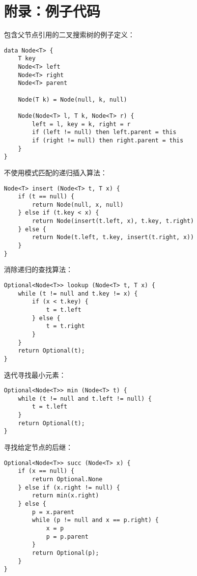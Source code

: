 \documentclass[b5paper]{ctexart}
\begin{document}
\section{附录：例子代码}

包含父节点引用的二叉搜索树的例子定义：

\lstset{language=Bourbaki, frame=single}
\begin{lstlisting}
data Node<T> {
    T key
    Node<T> left
    Node<T> right
    Node<T> parent

    Node(T k) = Node(null, k, null)

    Node(Node<T> l, T k, Node<T> r) {
        left = l, key = k, right = r
        if (left != null) then left.parent = this
        if (right != null) then right.parent = this
    }
}
\end{lstlisting}

不使用模式匹配的递归插入算法：

\begin{lstlisting}
Node<T> insert (Node<T> t, T x) {
    if (t == null) {
        return Node(null, x, null)
    } else if (t.key < x) {
        return Node(insert(t.left, x), t.key, t.right)
    } else {
        return Node(t.left, t.key, insert(t.right, x))
    }
}
\end{lstlisting}

消除递归的查找算法：

\begin{lstlisting}
Optional<Node<T>> lookup (Node<T> t, T x) {
    while (t != null and t.key != x) {
        if (x < t.key) {
            t = t.left
        } else {
            t = t.right
        }
    }
    return Optional(t);
}
\end{lstlisting}

迭代寻找最小元素：

\begin{lstlisting}
Optional<Node<T>> min (Node<T> t) {
    while (t != null and t.left != null) {
        t = t.left
    }
    return Optional(t);
}
\end{lstlisting}

寻找给定节点的后继：

\begin{lstlisting}
Optional<Node<T>> succ (Node<T> x) {
    if (x == null) {
        return Optional.None
    } else if (x.right != null) {
        return min(x.right)
    } else {
        p = x.parent
        while (p != null and x == p.right) {
            x = p
            p = p.parent
        }
        return Optional(p);
    }
}
\end{lstlisting}
\end{document}
